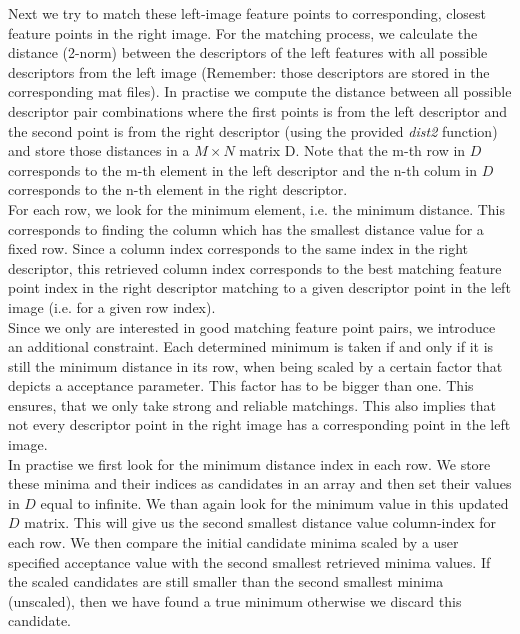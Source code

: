 \documentclass{paper}
\begin{document}
Next we try to match these left-image feature points to corresponding, closest feature points in the right image. For the matching process, we calculate the distance (2-norm) between the descriptors of the left features with all possible descriptors from the left image (Remember: those descriptors are stored in the corresponding mat files). In practise we compute the distance between all possible descriptor pair combinations where the first points is from the left descriptor and the second point is from the right descriptor (using the provided \emph{dist2} function) and store those distances in a $M \times N$ matrix D. Note that the m-th row in $D$ corresponds to the m-th element in the left descriptor and the n-th colum in $D$ corresponds to the n-th element in the right descriptor. \\

For each row, we look for the minimum element, i.e. the minimum distance. This corresponds to finding the column which has the smallest distance value for a fixed row. Since a column index corresponds to the same index in the right descriptor, this retrieved column index corresponds to the best matching feature point index in the right descriptor matching to a given descriptor point in the left image (i.e. for a given row index). \\

Since we only are interested in good matching feature point pairs, we introduce an additional constraint. Each determined minimum is taken if and only if it is still the minimum distance in its row, when being scaled by a certain factor that depicts a acceptance parameter. This factor has to be bigger than one. This ensures, that we only take strong and reliable matchings. This also implies that not every descriptor point in the right image has a corresponding point in the left image. \\

In practise we first look for the minimum distance index in each row. We store these minima and their indices as candidates in an array and then set their values in $D$ equal to infinite. We than again look for the minimum value in this updated $D$ matrix. This will give us the second smallest distance value column-index for each row. We then compare the initial candidate minima scaled by a user specified acceptance value with the second smallest retrieved minima values. If the scaled candidates are still smaller than the second smallest minima (unscaled), then we have found a true minimum otherwise we discard this candidate. \\
\end{document}
